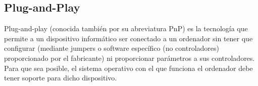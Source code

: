 \documentclass[12pt,oneside,a4paper]{article}
\begin{document}
		\cite{LPT}

	\subsection{Plug-and-Play}\label{sub:plug-and-play}
	
		Plug-and-play (conocida también por su abreviatura PnP) es la
		tecnología que permite a un dispositivo informático ser conectado a un
		ordenador sin tener que configurar (mediante jumpers o software
		específico (no controladores) proporcionado por el fabricante) ni
		proporcionar parámetros a sus controladores. Para que sea posible, el
		sistema operativo con el que funciona el ordenador debe tener soporte
		para dicho dispositivo.

		\cite{plugandplay}

\newpage

\clearpage

\end{document}
